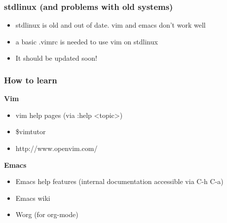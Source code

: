 \documentclass[8pt]{beamer}
\begin{document}
\begin{frame}
	\frametitle{stdlinux (and problems with old systems)}
	\begin{itemize}
		\item stdlinux is old and out of date. vim and emacs don't work well
		\item a basic .vimrc is needed to use vim on stdlinux
		\item It should be updated soon!
	\end{itemize}
\end{frame}

\begin{frame}
  \frametitle{How to learn}
  \textbf{Vim}
  \begin{itemize}
	\item vim help pages (via :help <topic>)
  \item \$vimtutor
  \item http://www.openvim.com/
  \end{itemize}
  \textbf{Emacs}
  \begin{itemize}
  \item Emacs help features (internal documentation accessible via C-h C-a)
  \item Emacs wiki
  \item Worg (for org-mode)
  \end{itemize}
\end{frame}
\end{document}
